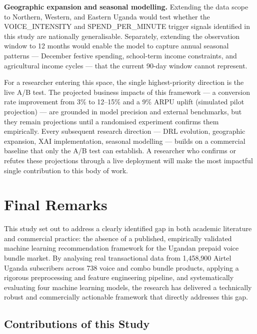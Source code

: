 \textbf{Geographic expansion and seasonal modelling.} Extending the data scope to
Northern, Western, and Eastern Uganda would test whether the
VOICE\_INTENSITY and SPEND\_PER\_MINUTE trigger signals identified in this study
are nationally generalisable. Separately, extending the observation window to
12 months would enable the model to capture annual seasonal patterns --- December
festive spending, school-term income constraints, and agricultural income cycles
--- that the current 90-day window cannot represent.

For a researcher entering this space, the single highest-priority direction is the
live A/B test. The projected business impacts of this framework --- a conversion
rate improvement from 3\% to 12--15\% and a 9\% ARPU uplift (simulated pilot projection) --- are grounded in
model precision and external benchmarks, but they remain projections until a
randomised experiment confirms them empirically. Every subsequent research
direction --- DRL evolution, geographic expansion, XAI implementation, seasonal
modelling --- builds on a commercial baseline that only the A/B test can
establish. A researcher who confirms or refutes these projections through a live
deployment will make the most impactful single contribution to this body of work.

\section{Final Remarks}

This study set out to address a clearly identified gap in both academic literature and commercial practice: the absence of a published, empirically validated machine learning recommendation framework for the Ugandan prepaid voice bundle market. By analysing real transactional data from 1,458,900 Airtel Uganda subscribers across 738 voice and combo bundle products, applying a rigorous preprocessing and feature engineering pipeline, and systematically evaluating four machine learning models, the research has delivered a technically robust and commercially actionable framework that directly addresses this gap.

\subsection*{Contributions of this Study}

